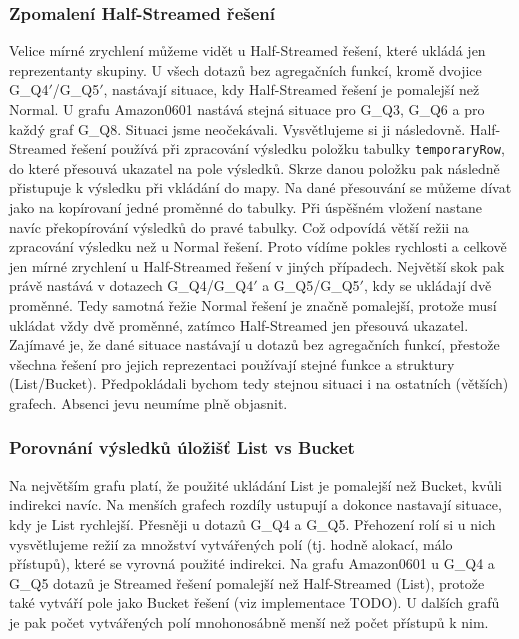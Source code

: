 \subsubsection{Zpomalení Half-Streamed řešení}

Velice mírné zrychlení můžeme vidět u Half-Streamed řešení, které ukládá jen reprezentanty skupiny.
U všech dotazů bez agregačních funkcí, kromě dvojice G\_Q4$'$/G\_Q5$'$, nastávají situace, kdy Half-Streamed řešení je pomalejší než Normal.
U grafu Amazon0601 nastává stejná situace pro G\_Q3, G\_Q6 a pro každý graf G\_Q8.
Situaci jsme neočekávali.
Vysvětlujeme si ji následovně.
Half-Streamed řešení používá při zpracování výsledku položku tabulky \verb+temporaryRow+, do které přesouvá ukazatel na pole výsledků.
Skrze danou položku pak následně přistupuje k výsledku při vkládání do mapy. 
Na dané přesouvání se můžeme dívat jako na kopírovaní jedné proměnné do tabulky.
Při úspěšném vložení nastane navíc překopírování výsledků do pravé tabulky.
Což odpovídá větší režii na zpracování výsledku než u Normal řešení.
Proto vídíme pokles rychlosti a celkově jen mírné zrychlení u Half-Streamed řešení v jiných případech.
Největší skok pak právě nastává v dotazech G\_Q4/G\_Q4$'$ a G\_Q5/G\_Q5$'$, kdy se ukládají dvě proměnné.
Tedy samotná řežie Normal řešení je značně pomalejší, protože musí ukládat vždy dvě proměnné, zatímco Half-Streamed jen přesouvá ukazatel.
Zajímavé je, že dané situace nastávají u dotazů bez agregačních funkcí, přestože všechna řešení pro jejich reprezentaci používají stejné funkce a struktury (List/Bucket).
Předpokládali bychom tedy stejnou situaci i na ostatních (větších) grafech.
Absenci jevu neumíme plně objasnit.

\subsubsection{Porovnání výsledků úložišť List vs Bucket}

Na největším grafu platí, že použité ukládání List je pomalejší než Bucket, kvůli indirekci navíc.
Na menších grafech rozdíly ustupují a dokonce nastavají situace, kdy je List rychlejší. 
Přesněji u dotazů G\_Q4 a G\_Q5.
Přehození rolí si u nich vysvětlujeme režií za množství vytvářených polí (tj. hodně alokací, málo přístupů), které se vyrovná použité indirekci.
Na grafu Amazon0601 u  G\_Q4 a G\_Q5 dotazů je Streamed řešení pomalejší než Half-Streamed (List), protože také vytváří pole jako Bucket řešení (viz implementace TODO).
U dalších grafů je pak počet vytvářených polí mnohonosábně menší než počet přístupů k nim.

